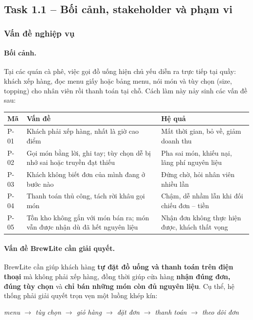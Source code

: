 \subsection{Task 1.1 -- Bối cảnh, stakeholder và phạm vi}

\subsubsection{Vấn đề nghiệp vụ}

\paragraph{Bối cảnh.}
Tại các quán cà phê, việc gọi đồ uống hiện chủ yếu diễn ra trực tiếp tại quầy: khách xếp hàng, đọc menu giấy hoặc bảng menu, nói món và tùy chọn (size, topping) cho nhân viên rồi thanh toán tại chỗ. Cách làm này nảy sinh các vấn đề sau:

{\small\renewcommand{\arraystretch}{1.25}
\begin{tabularx}{\linewidth}{@{}l X X@{}}
\toprule
\textbf{Mã} & \textbf{Vấn đề} & \textbf{Hệ quả} \\
\midrule
P-01 & Khách phải xếp hàng, nhất là giờ cao điểm & Mất thời gian, bỏ về, giảm doanh thu \\
P-02 & Gọi món bằng lời, ghi tay; tùy chọn dễ bị nhớ sai hoặc truyền đạt thiếu & Pha sai món, khiếu nại, lãng phí nguyên liệu \\
P-03 & Khách không biết đơn của mình đang ở bước nào & Đứng chờ, hỏi nhân viên nhiều lần \\
P-04 & Thanh toán thủ công, tách rời khâu gọi món & Chậm, dễ nhầm lẫn khi đối chiếu đơn -- tiền \\
P-05 & Tồn kho không gắn với món bán ra; món vẫn được nhận dù đã hết nguyên liệu & Nhận đơn không thực hiện được, khách thất vọng \\
\bottomrule
\end{tabularx}}

\paragraph{Vấn đề BrewLite cần giải quyết.}
BrewLite cần giúp khách hàng \textbf{tự đặt đồ uống và thanh toán trên điện thoại} mà không phải xếp hàng, đồng thời giúp cửa hàng \textbf{nhận đúng đơn, đúng tùy chọn} và \textbf{chỉ bán những món còn đủ nguyên liệu}. Cụ thể, hệ thống phải giải quyết trọn vẹn một luồng khép kín:

\begin{center}
\emph{menu $\rightarrow$ tùy chọn $\rightarrow$ giỏ hàng $\rightarrow$ đặt đơn $\rightarrow$ thanh toán $\rightarrow$ theo dõi đơn}
\end{center}

